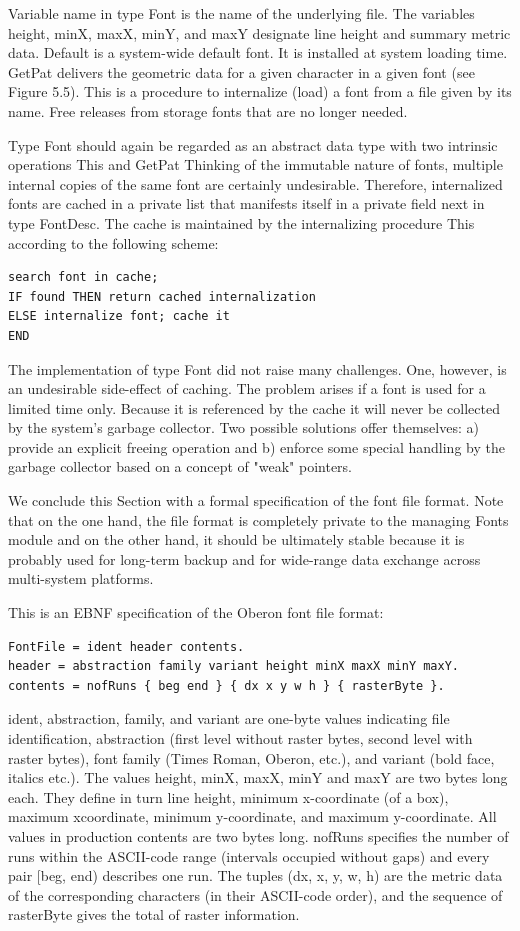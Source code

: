 Variable name in type Font is the name of the underlying file. The variables height, minX, maxX,
minY, and maxY designate line height and summary metric data. Default is a system-wide default
font. It is installed at system loading time. GetPat delivers the geometric data for a given character
in a given font (see Figure 5.5). This is a procedure to internalize (load) a font from a file given by
its name. Free releases from storage fonts that are no longer needed.

Type Font should again be regarded as an abstract data type with two intrinsic operations This and
GetPat Thinking of the immutable nature of fonts, multiple internal copies of the same font are
certainly undesirable. Therefore, internalized fonts are cached in a private list that manifests itself in
a private field next in type FontDesc. The cache is maintained by the internalizing procedure This
according to the following scheme:
\begin{verbatim}
search font in cache;
IF found THEN return cached internalization
ELSE internalize font; cache it
END
\end{verbatim}
The implementation of type Font did not raise many challenges. One, however, is an undesirable
side-effect of caching. The problem arises if a font is used for a limited time only. Because it is
referenced by the cache it will never be collected by the system's garbage collector. Two possible
solutions offer themselves: a) provide an explicit freeing operation and b) enforce some special
handling by the garbage collector based on a concept of "weak" pointers.

We conclude this Section with a formal specification of the font file format. Note that on the one
hand, the file format is completely private to the managing Fonts module and on the other hand, it
should be ultimately stable because it is probably used for long-term backup and for wide-range
data exchange across multi-system platforms.

This is an EBNF specification of the Oberon font file format:
\begin{verbatim}
FontFile = ident header contents.
header = abstraction family variant height minX maxX minY maxY.
contents = nofRuns { beg end } { dx x y w h } { rasterByte }.
\end{verbatim}
ident, abstraction, family, and variant are one-byte values indicating file identification, abstraction
(first level without raster bytes, second level with raster bytes), font family (Times Roman, Oberon,
etc.), and variant (bold face, italics etc.). The values height, minX, maxX, minY and maxY are two
bytes long each. They define in turn line height, minimum x-coordinate (of a box), maximum xcoordinate, minimum y-coordinate, and maximum y-coordinate. All values in production contents are two bytes long. nofRuns specifies the number of runs within the ASCII-code range (intervals
occupied without gaps) and every pair [beg, end) describes one run. The tuples (dx, x, y, w, h) are
the metric data of the corresponding characters (in their ASCII-code order), and the sequence of
rasterByte gives the total of raster information.

